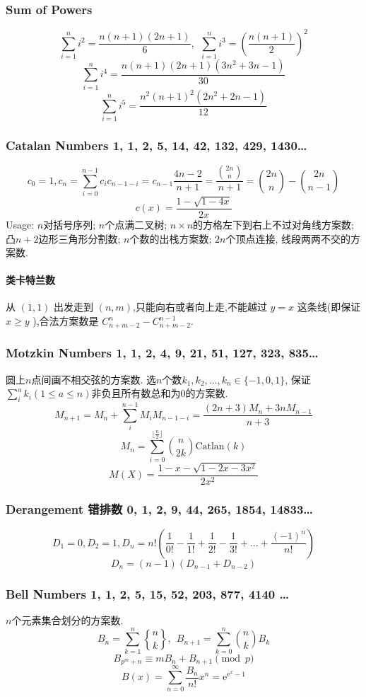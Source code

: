 \begin{footnotesize}
\subsubsection{Sum of Powers}
\[\sum_{i=1}^ni^2=\frac{n(n+1)(2n+1)}{6},\ \ \sum_{i=1}^ni^3=\left(\frac{n(n+1)}{2}\right)^2\]
\[\sum_{i=1}^ni^4=\frac{n(n+1)(2n+1)(3n^2+3n-1)}{30}\]
\[\sum_{i=1}^ni^5=\frac{n^2(n+1)^2(2n^2+2n-1)}{12}\]

\subsubsection{Catalan Numbers 1, 1, 2, 5, 14, 42, 132, 429, 1430\dots}
\[c_{0}=1,c_n=\sum_{i=0}^{n-1}c_ic_{n-1-i}=c_{n-1}\frac{4n-2}{n+1}=\frac{\binom{2n}{n}}{n+1}=\binom{2n}{n}-\binom{2n}{n-1}\]
\[ c(x)=\frac{1-\sqrt{1-4x}}{2x}\]
Usage: $n$对括号序列; $n$个点满二叉树; $n\times n$的方格左下到右上不过对角线方案数; 凸$n+2$边形三角形分割数; $n$个数的出栈方案数; $2n$个顶点连接, 线段两两不交的方案数.
\paragraph*{类卡特兰数}
从 $(1,1)$ 出发走到 $(n,m)$,只能向右或者向上走,不能越过 $y=x$ 这条线(即保证 $x\geq y$ ),合法方案数是 $C_{n+m-2}^{n} - C_{n+m-2}^{n-1}$.
\subsubsection{Motzkin Numbers 1, 1, 2, 4, 9, 21, 51, 127, 323, 835\dots}
圆上$n$点间画不相交弦的方案数. 选$n$个数$k_1,k_2,...,k_n\in\{-1,0,1\}$, 保证$\sum_i^ak_i(1\leq a\leq n)$非负且所有数总和为$0$的方案数. \[M_{n+1}=M_n+\sum_i^{n-1}M_iM_{n-1-i}=\frac{(2n+3)M_n+3nM_{n-1}}{n+3}\]
\[M_n=\sum_{i=0}^{\lfloor \frac{n}{2}\rfloor}\binom{n}{2k} \mathrm{Catlan}(k)\]
\[M(X)=\frac{1-x-\sqrt{1-2x-3x^2}}{2x^2}\]
\subsubsection{Derangement 错排数 0, 1, 2, 9, 44, 265, 1854, 14833\dots}
\[D_1=0,D_2=1,D_n=n!(\frac{1}{0!}-\frac{1}{1!}+\frac{1}{2!}-\frac{1}{3!}+...+\frac{(-1)^n}{n!})\]
\[D_n=(n-1)(D_{n-1}+D_{n-2})\]
\subsubsection{Bell Numbers 1, 1, 2, 5, 15, 52, 203, 877, 4140 \dots}
$n$个元素集合划分的方案数.
\[ B_n=\sum_{k=1}^{n}{n\brace k},\ \ B_{n+1} = \sum_{k=0}^n{n \choose k}B_k \]
\[ B_{p^m+n} \equiv mB_n+B_{n+1} \pmod{p} \]
\[B(x)=\sum_{n=0}^{\infty}\frac{B_n}{n!}x^n=\mathrm{e}^{\mathrm{e}^x-1}\]

\end{footnotesize}
